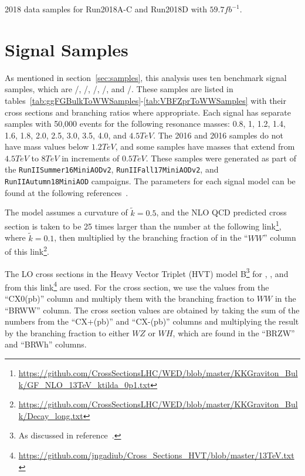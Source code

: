 \begin{table}[htbp]
  \centering
  
  \caption{
    2018 data samples for Run2018A-C and Run2018D with $59.7\unit{fb^{-1}}$.
  }
  \label{tab:dataSamples2018}
\end{table}

\section{Signal Samples}
\label{sec:sigSamples}

As mentioned in section~\ref{sec:samples}, this analysis uses ten benchmark signal samples, which are \ggF/\VBF\GBulktoWWtolnuqqbarpr, \ggF/\VBF\RadtoWWtolnuqqbarpr, \DY/\VBF\WprtoWZtolnuqqbar, \DY/\VBF\WprtoWHtolnubbbar, and \DY/\VBF\ZprtoWWtolnuqqbarpr.
These samples are listed in tables~\ref{tab:ggFGBulkToWWSamples}-\ref{tab:VBFZprToWWSamples} with their cross sections and branching ratios where appropriate.
Each signal has separate samples with 50,000 events for the following resonance masses: 0.8, 1, 1.2, 1.4, 1.6, 1.8, 2.0, 2.5, 3.0, 3.5, 4.0, and $4.5\unit{TeV}$.
The 2016 \VBF\ZprtoWW and 2016 \VBF\WprtoWZ samples do not have mass values below $1.2\unit{TeV}$, and some samples have masses that extend from $4.5\unit{TeV}$ to $8\unit{TeV}$ in increments of $0.5\unit{TeV}$.
These samples were generated as part of the \texttt{RunIISummer16MiniAODv2}, \texttt{RunIIFall17MiniAODv2}, and \texttt{RunIIAutumn18MiniAOD} campaigns.
The parameters for each signal model can be found at the following references~\cite{git:BulkGrav_WW,git:Wpr_WZ,git:Wpr_WH,git:VBFRad_WW}.

The \ggF\GBulktoWW model assumes a curvature of $\tilde{k}=0.5$, and the NLO QCD predicted cross section is taken to be 25 times larger than the number at the following link\footnote{\url{https://github.com/CrossSectionsLHC/WED/blob/master/KKGraviton\_Bulk/GF\_NLO\_13TeV\_ktilda_0p1.txt}}, where $\tilde{k}=0.1$, then multiplied by the branching fraction of \GBulktoWW in the ``$WW$'' column of this link\footnote{\url{https://github.com/CrossSectionsLHC/WED/blob/master/KKGraviton\_Bulk/Decay\_long.txt}}. %

The LO cross sections in the Heavy Vector Triplet (HVT) model B\footnote{As discussed in reference~\cite{Pappadopulo_2014}.} for \DY\ZprtoWW, \DY\WprtoWZ, and \DY\WprtoWH from this link\footnote{\url{https://github.com/jngadiub/Cross\_Sections\_HVT/blob/master/13TeV.txt}} are used. %
For the \Zpr cross section, we use the values from the ``CX0(pb)'' column and multiply them with the branching fraction to $WW$ in the ``BRWW'' column.
The \Wpr cross section values are obtained by taking the sum of the numbers from the ``CX+(pb)'' and ``CX-(pb)'' columns and multiplying the result by the branching fraction to either $WZ$ or $WH$, which are found in the ``BRZW'' and ``BRWh'' columns.

